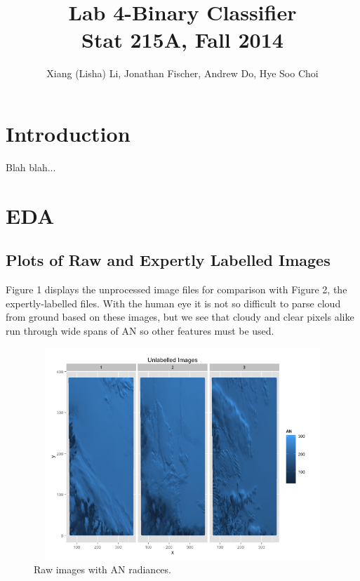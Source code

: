 \documentclass{article}\usepackage[]{graphicx}\usepackage[]{color}
\begin{document}
\title{Lab 4-Binary Classifier\\
Stat 215A, Fall 2014}

\author{Xiang (Lisha) Li, Jonathan Fischer, Andrew Do, Hye Soo Choi}

\maketitle

\section{Introduction}
Blah blah...

\section{EDA}

\subsection{Plots of Raw and Expertly Labelled Images}
Figure 1 displays the unprocessed image files for comparison with Figure 2, the expertly-labelled files. With the human eye it is not so difficult to parse cloud from ground based on these images, but we see that cloudy and clear pixels alike run through wide spans of AN so other features must be used.
\begin{figure}[H]
\includegraphics[width = 18cm, height=8cm]{RAWEDA.png}
\caption{Raw images with AN radiances.}
\end{figure}
\end{document}

